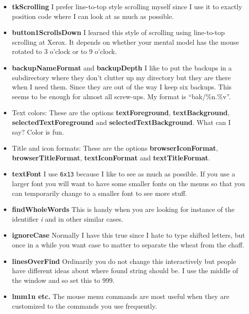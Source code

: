\begin{itemize}

\item {\bf tkScrolling}
I prefer line-to-top style scrolling myself since I use it to exactly
position code where I can look at as much as possible.

\item {\bf button1ScrollsDown}
I learned this style of scrolling using line-to-top scrolling at Xerox.
It depends on whether your mental model has the mouse rotated to 3
o'clock or to 9 o'clock.

\item {\bf backupNameFormat} and {\bf backupDepth}
I like to put the backups in a subdirectory where they don't clutter
up my directory but they are there when I need them.
Since they are out of the way I keep six backups.
This seems to be enough for almost all screw-ups.
My format is ``bak/\%n.\%v''.

\item Text colors:
These are the options {\bf textForeground}, {\bf textBackground},
{\bf selectedTextForeground} and {\bf selectedTextBackground}.
What can I say?  Color is fun.

\item Title and icon formats:
These are the options {\bf browserIconFormat}, {\bf browserTitleFormat},
{\bf textIconFormat} and {\bf textTitleFormat}.

\item {\bf textFont}
I use {\tt 6x13} because I like to see as much as possible.
If you use a larger font you will want to have some smaller fonts
on the menus so that you can temporarily change to a smaller font
to see more stuff.

\item {\bf findWholeWords}
This is handy when you are looking for instance of the identifier
{\it i} and in other similar cases.

\item {\bf ignoreCase}
Normally I have this true since I hate to type shifted letters,
but once in a while you want case to matter to separate the wheat
from the chaff.

\item {\bf linesOverFind}
Ordinarily you do not change this interactively but people have
different ideas about where found string should be.
I use the middle of the window and so set this to 999.

\item {\bf lmm1n etc.}
The mouse menu commands are most useful when they are customized
to the commands you use frequently.

\end{itemize}



